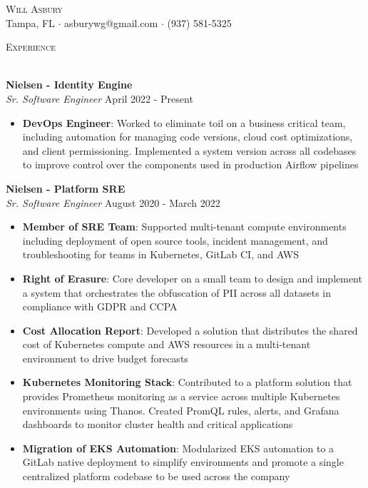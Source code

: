 \documentclass[a4paper]{article}
\newcommand{\lineunder} {
    \vspace*{-8pt} \\
    \hspace*{-18pt} \hrulefill \\
}
\newcommand{\header} [1] {
    {\hspace*{-18pt}\vspace*{6pt} \textsc{#1}}
    \vspace*{-6pt} \lineunder
}
\begin{document}
\vspace*{-40pt}

\vspace*{-10pt}
\begin{center}
	{\Huge \scshape {Will Asbury}}\\
	Tampa, FL $\cdot$ asburywg@gmail.com $\cdot$ (937) 581-5325\\
\end{center}

\header{Experience}
\vspace{1mm}

\textbf{Nielsen - Identity Engine}\\
\textit{Sr. Software Engineer} \hfill April 2022 - Present\\
\vspace{-1mm}
\begin{itemize} \itemsep 1pt
    \item \textbf{DevOps Engineer}: Worked to eliminate toil on a business critical team, including automation for managing code versions, cloud cost optimizations, and client permissioning. Implemented a system version across all codebases to improve control over the components used in production Airflow pipelines
\end{itemize}

\textbf{Nielsen - Platform SRE}\\
\textit{Sr. Software Engineer} \hfill August 2020 - March 2022\\
\vspace{-1mm}
\begin{itemize} \itemsep 1pt
    \item \textbf{Member of SRE Team}: Supported multi-tenant compute environments including deployment of open source tools, incident management, and troubleshooting for teams in Kubernetes, GitLab CI, and AWS
    \item \textbf{Right of Erasure}: Core developer on a small team to design and implement a system that orchestrates the obfuscation of PII across all datasets in compliance with GDPR and CCPA
    \item \textbf{Cost Allocation Report}: Developed a solution that distributes the shared cost of Kubernetes compute and AWS resources in a multi-tenant environment to drive budget forecasts
    \item \textbf{Kubernetes Monitoring Stack}: Contributed to a platform solution that provides Prometheus monitoring as a service across multiple Kubernetes environments using Thanos. Created PromQL rules, alerts, and Grafana dashboards to monitor cluster health and critical applications
    \item \textbf{Migration of EKS Automation}: Modularized EKS automation to a GitLab native deployment to simplify environments and promote a single centralized platform codebase to be used across the company
\end{itemize}
\end{document}
